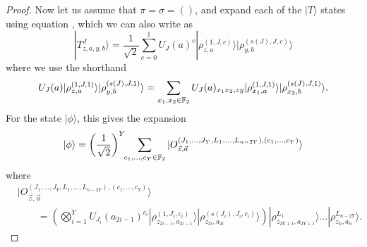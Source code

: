 \documentclass[../thesis-main/thesis-main]{subfiles}
\begin{document}
\begin{proof}
Now let us assume that $\pi = \sigma = ()$, and expand each of the $|T\rangle$ states using equation ,
which we can also write as
\begin{equation}
|T_{z,a,y,b}^{J}\rangle=\frac{1}{\sqrt{2}}\sum_{c=0}^{1}U_{J}(a)^{c}|\rho_{z,a}^{(1,J,c)}\rangle|\rho_{y,b}^{(s(J),J,c)}\rangle
\end{equation}
where we use the shorthand
\begin{equation}
U_{J}(a)|\rho_{z,a}^{(1,J,1)}\rangle|\rho_{y,b}^{(s(J),J,1)}\rangle=\sum_{x_{1},x_{2}\in\mathbb{F}_2}U_{J}(a)_{x_{1}x_{2},zy}|\rho_{x_{1},a}^{(1,J,1)}\rangle|\rho_{x_{2},b}^{(s(J),J,1)}\rangle.\label{eq:Vtothec}
\end{equation}
For the state $|\phi\rangle$, this gives the expansion
\begin{equation}
|\phi\rangle=\left(\frac{1}{\sqrt{2}}\right)^{Y}\!\!\sum_{c_{1},\ldots,c_{Y}\in\mathbb{F}_2}|O_{\vec{z},\vec{a}}^{(J_{1},\ldots,J_{Y},L_{1},\ldots,L_{n-2Y}),(c_{1},\ldots,c_{Y})}\rangle
\end{equation}
where 
\begin{align}
&|O_{\vec{z},\vec{a}}^{(J_{1},\ldots,J_{Y},L_{1},\ldots,L_{n-2Y}),(c_{1},\ldots,c_{Y})}\rangle\nonumber\\
&\qquad=\left(\bigotimes_{i=1}^{Y}U_{J_{i}}(a_{2i-1})^{c_{i}}|\rho_{z_{2i-1},a_{2i-1}}^{(1,J_{i},c_{i})}\rangle|\rho_{z_{2i},a_{2i}}^{(s(J_{i}),J_{i},c_{i})}\rangle\right)|\rho_{z_{2Y+1},a_{2Y+1}}^{L_{1}}\rangle\ldots|\rho_{z_{n},a_{n}}^{L_{n-2Y}}\rangle.\label{eq:O_state}
\end{align}


\end{proof}
\end{document}
